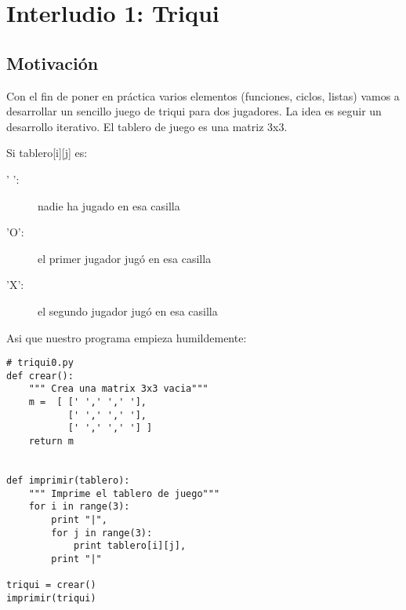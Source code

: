 


\chapter{Interludio 1: Triqui}



\section{Motivación}

Con el fin de poner en práctica varios elementos (funciones, ciclos, listas)
vamos a desarrollar un sencillo juego de triqui para dos jugadores. La idea
es seguir un desarrollo iterativo. El tablero de juego es una matriz 3x3. 

Si tablero[i][j] es:

\begin{description}
  \item[' ':]  nadie ha jugado en esa casilla
  \item['O': ] el primer jugador jugó en esa casilla
  \item['X':] el segundo jugador jugó en esa casilla
\end{description}

Asi que nuestro programa empieza humildemente:

\beforeverb
\begin{verbatim}
# triqui0.py
def crear():
    """ Crea una matrix 3x3 vacia"""
    m =  [ [' ',' ',' '],
           [' ',' ',' '],
           [' ',' ',' '] ]
    return m


def imprimir(tablero):
    """ Imprime el tablero de juego"""
    for i in range(3):
        print "|",
        for j in range(3):
            print tablero[i][j],
        print "|"
        
triqui = crear()
imprimir(triqui)
\end{verbatim}
\afterverb

